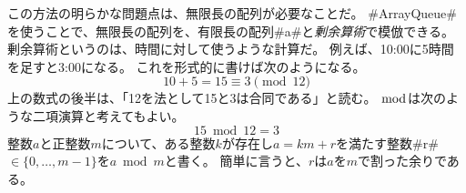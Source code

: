 この方法の明らかな問題点は、無限長の配列が必要なことだ。
#ArrayQueue#を使うことで、無限長の配列を、有限長の配列#a#と\emph{剰余算術}で模倣できる。
%
剰余算術というのは、時間に対して使うような計算だ。
例えば、10:00に5時間を足すと3:00になる。
これを形式的に書けば次のようになる。
\[
    10 + 5 = 15 \equiv 3 \pmod{12}
\]
上の数式の後半は、「12を法として15と3は合同である」と読む。
$\bmod$は次のような二項演算と考えてもよい。
\[
   15 \bmod 12 = 3
\]
整数$a$と正整数$m$について、ある整数$k$が存在し$a = km + r$を満たす整数#r# $\in \{0, \ldots, m-1 \}$を$a \bmod m $と書く。
簡単に言うと、$r$は$a$を$m$で割った余りである。
